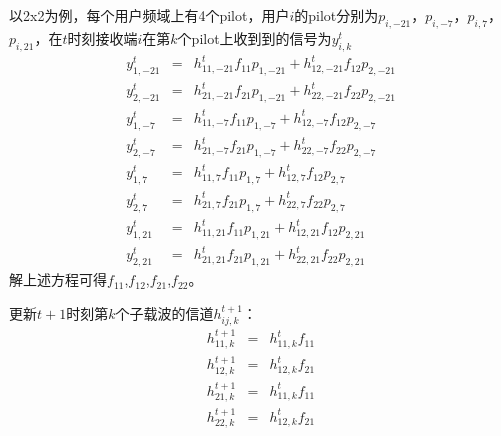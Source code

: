 以2x2为例，每个用户频域上有4个pilot，用户$i$的pilot分别为$p_{i,-21}$，$p_{i,-7}$，$p_{i,7}$，$p_{i,21}$，在$t$时刻接收端$i$在第$k$个pilot上收到到的信号为$y_{i, k}^{t}$
\begin{eqnarray}
y_{1, -21}^{t} & = & h_{11,-21}^{t}f_{11}p_{1,-21} + h_{12,-21}^{t}f_{12}p_{2,-21} \\
y_{2, -21}^{t} & = & h_{21,-21}^{t}f_{21}p_{1,-21} + h_{22,-21}^{t}f_{22}p_{2,-21} \\
y_{1, -7}^{t}   & = & h_{11,-7}^{t}f_{11}p_{1,-7} + h_{12,-7}^{t}f_{12}p_{2,-7} \\
y_{2, -7}^{t}   & = & h_{21,-7}^{t}f_{21}p_{1,-7} + h_{22,-7}^{t}f_{22}p_{2,-7} \\
y_{1, 7}^{t}   & = & h_{11,7}^{t}f_{11}p_{1,7} + h_{12,7}^{t}f_{12}p_{2,7} \\
y_{2, 7}^{t}   & = & h_{21,7}^{t}f_{21}p_{1,7} + h_{22,7}^{t}f_{22}p_{2,7} \\
y_{1, 21}^{t} & = & h_{11,21}^{t}f_{11}p_{1,21} + h_{12,21}^{t}f_{12}p_{2,21} \\
y_{2, 21}^{t} & = & h_{21,21}^{t}f_{21}p_{1,21} + h_{22,21}^{t}f_{22}p_{2,21}
\end{eqnarray}
解上述方程可得$f_{11}$,$f_{12}$,$f_{21}$,$f_{22}$。

更新$t+1$时刻第$k$个子载波的信道$h_{ij, k}^{t+1}$：
\begin{eqnarray}
h_{11, k}^{t+1} & = & h_{11,k}^{t}f_{11} \\
h_{12, k}^{t+1} & = & h_{12,k}^{t}f_{21}\\
h_{21, k}^{t+1} & = & h_{11,k}^{t}f_{11} \\
h_{22, k}^{t+1} & = & h_{12,k}^{t}f_{21}
\end{eqnarray}











